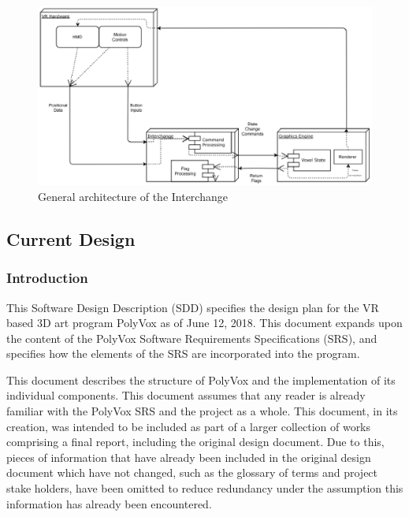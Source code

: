 \documentclass[onecolumn, draftclsnofoot,10pt, compsoc]{IEEEtran}
\newcounter{threesection}[subsubsection]
\begin{document}
\begin{figure}[H]
\begin{center}
\includegraphics[width=\textwidth]{Interchange.eps}
\caption{General architecture of the Interchange}
\end{center}
\end{figure}


\subsection{Current Design}

\subsubsection{Introduction}

This Software Design Description (SDD) specifies the design plan for the VR based 3D art program PolyVox as of June 12, 2018.
This document expands upon the content of the PolyVox Software Requirements Specifications (SRS), and specifies how the elements of the SRS are incorporated into the program.

This document describes the structure of PolyVox and the implementation of its individual components.
This document assumes that any reader is already familiar with the PolyVox SRS and the project as a whole.
This document, in its creation, was intended to be included as part of a larger collection of works comprising a final report, including the original design document.
Due to this, pieces of information that have already been included in the original design document which have not changed, such as the glossary of terms and project stake holders, have been omitted to reduce redundancy under the assumption this information has already been encountered.
\end{document}
